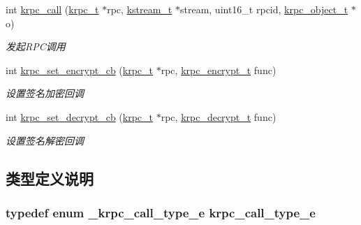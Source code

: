 \begin{DoxyCompactItemize}
int \hyperlink{a00086_a063313e66bd9a479b4d0a6295a5e665b_a063313e66bd9a479b4d0a6295a5e665b}{krpc\+\_\+call} (\hyperlink{a00051_a1e414ac6f6de24462ccf81e10f63428d_a1e414ac6f6de24462ccf81e10f63428d}{krpc\+\_\+t} $\ast$rpc, \hyperlink{a00051_acc208c4c40c875eebbfef88f00fffacf_acc208c4c40c875eebbfef88f00fffacf}{kstream\+\_\+t} $\ast$stream, uint16\+\_\+t rpcid, \hyperlink{a00051_a9c07dfc8c3b965f75b09f82fdb1bbb1e_a9c07dfc8c3b965f75b09f82fdb1bbb1e}{krpc\+\_\+object\+\_\+t} $\ast$o)
\begin{DoxyCompactList}\small\item\em 发起\+R\+P\+C调用 \end{DoxyCompactList}\item 
int \hyperlink{a00086_a5317bb571cb4d94bc56b83989c1b10c2_a5317bb571cb4d94bc56b83989c1b10c2}{krpc\+\_\+set\+\_\+encrypt\+\_\+cb} (\hyperlink{a00051_a1e414ac6f6de24462ccf81e10f63428d_a1e414ac6f6de24462ccf81e10f63428d}{krpc\+\_\+t} $\ast$rpc, \hyperlink{a00051_ae41a67cc07f8dff897ca978e03b1f2d7_ae41a67cc07f8dff897ca978e03b1f2d7}{krpc\+\_\+encrypt\+\_\+t} func)
\begin{DoxyCompactList}\small\item\em 设置签名加密回调 \end{DoxyCompactList}\item 
int \hyperlink{a00086_aa75ec66092e77639ca2cf2b5ad04c5db_aa75ec66092e77639ca2cf2b5ad04c5db}{krpc\+\_\+set\+\_\+decrypt\+\_\+cb} (\hyperlink{a00051_a1e414ac6f6de24462ccf81e10f63428d_a1e414ac6f6de24462ccf81e10f63428d}{krpc\+\_\+t} $\ast$rpc, \hyperlink{a00051_a5cf750f151c90f0589f68fe8c4421f1d_a5cf750f151c90f0589f68fe8c4421f1d}{krpc\+\_\+decrypt\+\_\+t} func)
\begin{DoxyCompactList}\small\item\em 设置签名解密回调 \end{DoxyCompactList}\end{DoxyCompactItemize}


\subsection{类型定义说明}
\hypertarget{a00086_aa7109e23eab2e74945868adf0b60132b_aa7109e23eab2e74945868adf0b60132b}{}
\subsubsection[{krpc\+\_\+call\+\_\+type\+\_\+e}]{\setlength{\rightskip}{0pt plus 5cm}typedef enum {\bf \+\_\+krpc\+\_\+call\+\_\+type\+\_\+e}  {\bf krpc\+\_\+call\+\_\+type\+\_\+e}}\label{a00086_aa7109e23eab2e74945868adf0b60132b_aa7109e23eab2e74945868adf0b60132b}
\hypertarget{a00086_aaadecef3a6bd120b41aee1916b5854d0_aaadecef3a6bd120b41aee1916b5854d0}{}
